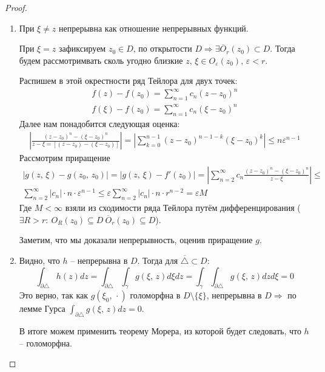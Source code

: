 \documentclass[a4paper,12pt]{article}
\renewcommand{\leq}{\ensuremath{\leqslant}}
\theoremstyle{plain}
\theoremstyle{definition}
\theoremstyle{remark}
\begin{document}
\begin{proof}
	\begin{enumerate}
		\item При $\xi \neq z$ непрерывна как отношение непрерывных функций.

		      При $\xi = z$ зафиксируем $z_0 \in D$, по открытости $D \Rightarrow \exists \overline{O}_r(z_0) \subset D$. Тогда будем рассмотримвать сколь угодно близкие $z,\, \xi \in O_\varepsilon(z_0),\, \varepsilon < r$.

		      Распишем в этой окрестности ряд Тейлора для двух точек:
		      \begin{align*}
			      f(z) - f(z_0) = \sum_{n = 1}^\infty c_n(z - z_0)^n \\
			      f(\xi) - f(z_0) = \sum_{n = 1}^\infty c_n(\xi - z_0)^n
		      \end{align*}
		      Далее нам понадобится следующая оценка:
		      \begin{align*}
			      \left\vert\frac{(z - z_0)^n - (\xi - z_0)^n}{z - \xi = [(z - z_0) - (\xi - z_0)]}\right\vert = \left\vert\sum_{k = 0}^{n - 1}(z - z_0)^{n - 1 - k}(\xi - z_0)^k\right\vert \leq n\varepsilon^{n-1}
		      \end{align*}
		      Рассмотрим приращение
		      \begin{align*}
			      \vert g(z,\, \xi) - g(z_0,\, z_0)\vert = \vert g(z,\, \xi) - f'(z_0)\vert = \left\vert\sum_{n = 2}^\infty c_n \frac{(z - z_0)^n - (\xi - z_0)^n}{z - \xi}\right\vert \leq \\
			      \sum_{n = 2}^\infty \vert c_n\vert\cdot n\cdot\varepsilon^{n - 1} \leq \varepsilon\sum_{n = 2}^\infty \vert c_n\vert\cdot n\cdot r^{n - 2} = \varepsilon M
		      \end{align*}
		      Где $M < \infty$ взяли из сходимости ряда Тейлора путём дифференцирования ($\exists R > r :\: O_R(z_0) \subseteq D \: \overline{O}_r(z_0) \subseteq D$).

		      Заметим, что мы доказали непрерывность, оценив приращение $g$.
		\item Видно, что $h$ -- непрерывна в $D$. Тогда для $\overline{\triangle} \subset D$:
		      \[
			      \int_{\partial\triangle} h(z)dz = \int_{\partial\triangle}\int_\gamma g(\xi,\,z)d\xi dz = \int_\gamma\int_{\partial\triangle}g(\xi,\,z)dzd\xi = 0
		      \]
		      Это верно, так как $g(\xi_0,\, \cdot)$ голоморфна в $D \setminus \{\xi\}$, непрерывна в $D \Rightarrow$ по лемме Гурса $\int_{\partial\triangle}g(\xi,\,z)dz = 0$.

		      В итоге можем применить теорему Морера, из которой будет следовать, что $h$ -- голоморфна.
	\end{enumerate}
\end{proof}
\end{document}
